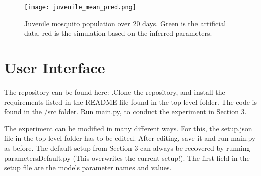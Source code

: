 \documentclass{article}
\begin{document}
\begin{figure}
\centering
    \texttt{[image: juvenile\_mean\_pred.png]}
    \caption{Juvenile mosquito population over 20 days. Green is the artificial data, red is the simulation based on the inferred parameters.}
    \label{fig:J_prediction}
\end{figure}




\section{User Interface}
The repository can be found here: \cite{SoftwarePractical}.\newline Clone the repository, and install the requirements listed in the README file found in the top-level folder. The code is found in the /src folder. Run main.py, to conduct the experiment in Section 3.

The experiment can be modified in many different ways. For this, the setup.json file in the top-level folder has to be edited. After editing, save it and run main.py as before. The default setup from Section 3 can always be recovered by running parametersDefault.py (This overwrites the current setup!).
\newpage
The first field in the setup file are the models parameter names and values. 
\end{document}
